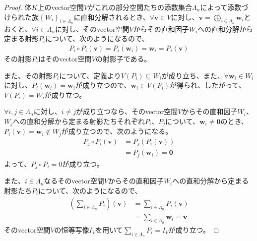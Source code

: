 \documentclass[dvipdfmx]{jsarticle}
\begin{document}
\begin{proof}
体$K$上のvector空間$V$がこれの部分空間たちの添数集合$\varLambda_{n}$によって添数づけられた族$\left\{ W_{i} \right\}_{i \in \varLambda_{n}}$に直和分解されるとき、$\forall\mathbf{v} \in V$に対し、$\mathbf{v} = \bigoplus_{i \in \varLambda_{n}} \mathbf{w}_{i}$とおくと、$\forall i \in \varLambda_{n}$に対し、そのvector空間$V$からその直和因子$W_{i}$への直和分解から定まる射影$P_{i}$について、次のようになるので、
\begin{align*}
P_{i} \circ P_{i}\left( \mathbf{v} \right) = P_{i}\left( \mathbf{w}_{i} \right) = \mathbf{w}_{i} = P_{i}\left( \mathbf{v} \right)
\end{align*}
その射影$P_{i}$はそのvector空間$V$の射影子である。\par
また、その射影$P_{i}$について、定義より$V\left( P_{i} \right) \subseteq W_{i}$が成り立ち、また、$\forall\mathbf{w}_{i} \in W_{i}$に対し、$P_{i}\left( \mathbf{w}_{i} \right) = \mathbf{w}_{i}$が成り立つので、$\mathbf{w}_{i} \in V\left( P_{i} \right)$が得られ、したがって、$V\left( P_{i} \right) = W_{i}$が成り立つ。\par
$\forall i,j \in \varLambda_{n}$に対し、$i \neq j$が成り立つなら、そのvector空間$V$からその直和因子$W_{i}$、$W_{j}$への直和分解から定まる射影たちそれぞれ$P_{i}$、$P_{j}$について、$\mathbf{w}_{i} \neq \mathbf{0}$のとき、$P_{i}\left( \mathbf{v} \right) = \mathbf{w}_{i} \notin W_{j}$が成り立つので、次のようになる。
\begin{align*}
P_{j} \circ P_{i}\left( \mathbf{v} \right) &= P_{j}\left( P_{i}\left( \mathbf{v} \right) \right)\\
&= P_{j}\left( \mathbf{w}_{i} \right) = \mathbf{0}
\end{align*}
よって、$P_{j} \circ P_{i} = 0$が成り立つ。\par
また、$i \in \varLambda_{n}$なるそのvector空間$V$からその直和因子$W_{i}$への直和分解から定まる射影たち$P_{i}$について、次のようになるので、
\begin{align*}
\left( \sum_{i \in \varLambda_{n}} P_{i} \right)\left( \mathbf{v} \right) &= \sum_{i \in \varLambda_{n}} {P_{i}\left( \mathbf{v} \right)}\\
&= \sum_{i \in \varLambda_{n}} \mathbf{w}_{i} = \mathbf{v}
\end{align*}
そのvector空間$V$の恒等写像$I_{V}$を用いて$\sum_{i \in \varLambda_{n}} P_{i} = I_{V}$が成り立つ。\par

\end{proof}
\end{document}
